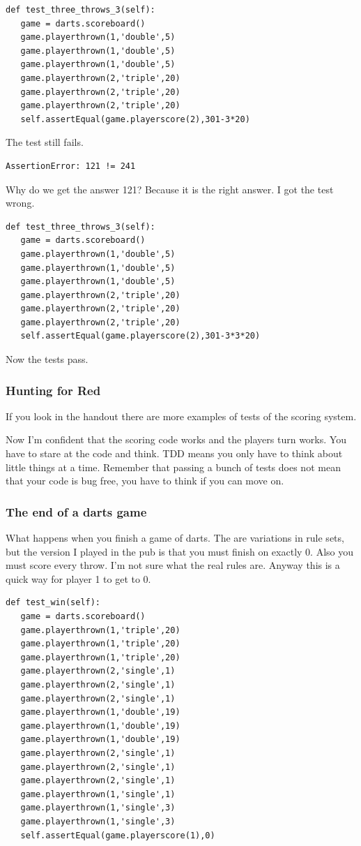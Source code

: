 \documentclass{beamer}
\begin{document}
\begin{frame}[fragile]
\begin{lstlisting}
def test_three_throws_3(self):
   game = darts.scoreboard()
   game.playerthrown(1,'double',5)
   game.playerthrown(1,'double',5)
   game.playerthrown(1,'double',5)
   game.playerthrown(2,'triple',20)
   game.playerthrown(2,'triple',20)
   game.playerthrown(2,'triple',20)
   self.assertEqual(game.playerscore(2),301-3*20)
\end{lstlisting}
The test still fails.
\begin{verbatim}
AssertionError: 121 != 241
\end{verbatim}
\end{frame}
\begin{frame}[fragile]
Why do we get the answer 121? Because it is the right answer. I got
the test wrong.
\begin{lstlisting}
def test_three_throws_3(self):
   game = darts.scoreboard()
   game.playerthrown(1,'double',5)
   game.playerthrown(1,'double',5)
   game.playerthrown(1,'double',5)
   game.playerthrown(2,'triple',20)
   game.playerthrown(2,'triple',20)
   game.playerthrown(2,'triple',20)
   self.assertEqual(game.playerscore(2),301-3*3*20)
\end{lstlisting}
Now the tests pass.  
\end{frame}
\begin{frame}
\frametitle{Hunting for Red}
If you look in the handout there are more examples of tests of the
scoring system.

Now I'm confident that the scoring code works and the players turn
works. You have to stare at the code and think. TDD means you only
have to think about little things at a time. Remember that passing a
bunch of tests does not mean that your code is bug free, you have to
think if you can move on.
  
\end{frame}
\begin{frame}
\frametitle{The end of a darts game}
What happens when you finish a game of darts. The are variations in
rule sets, but the version I played in the pub is that you must finish
on exactly 0.  Also you must score every throw. I'm not sure what the
real rules are. Anyway this is a quick way for player 1 to get to 0.
\end{frame}
\begin{frame}[fragile]
\begin{lstlisting}
def test_win(self):
   game = darts.scoreboard()
   game.playerthrown(1,'triple',20)
   game.playerthrown(1,'triple',20)
   game.playerthrown(1,'triple',20)
   game.playerthrown(2,'single',1)
   game.playerthrown(2,'single',1)
   game.playerthrown(2,'single',1)
   game.playerthrown(1,'double',19)
   game.playerthrown(1,'double',19)
   game.playerthrown(1,'double',19)
   game.playerthrown(2,'single',1)
   game.playerthrown(2,'single',1)
   game.playerthrown(2,'single',1)
   game.playerthrown(1,'single',1)
   game.playerthrown(1,'single',3)
   game.playerthrown(1,'single',3)
   self.assertEqual(game.playerscore(1),0)  
\end{lstlisting}
\end{frame}
\end{document}
